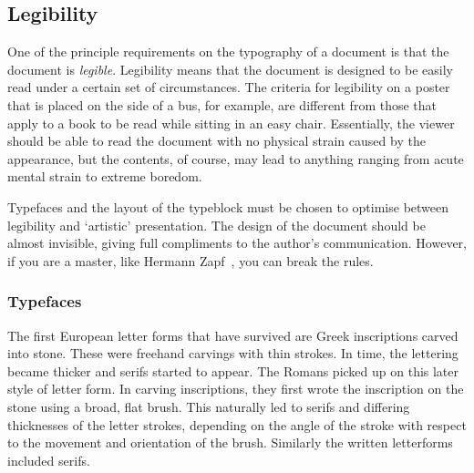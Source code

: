 \documentclass[10pt,letterpaper,extrafontsizes]{memoir}
\begin{document}
    

\subsection{Legibility}

    One of the principle requirements on the typography of a document is 
that the document is \emph{legible}. Legibility 
means that the document 
is designed to be easily read under a certain set of circumstances. 
The criteria for
legibility on a poster that is placed on the side of a bus, for example, are
different from those that apply to a book to be read while sitting in an
easy chair. Essentially, the viewer should be able to read the document
with no physical strain caused by the appearance, but the contents, 
of course, may lead to anything ranging from acute mental strain to 
extreme boredom.

    Typefaces and the layout of the 
typeblock must be 
chosen to optimise between legibility and `artistic' presentation. 
The design of the document should be almost invisible, giving full 
compliments to the author's communication. However, if you are a master, 
like Hermann Zapf~\autocite{ZAPF00}, you can break the rules.

    

\subsubsection{Typefaces}

    The first European letter forms that have survived are Greek inscriptions
carved into stone. These were freehand carvings with thin strokes. In time,
the lettering became thicker and serifs started to appear. The Romans
picked up on this later style of letter form. In carving inscriptions, they
first wrote the inscription on the stone using a broad, flat brush. This
naturally led to serifs and differing thicknesses of the letter strokes,
depending on the angle of the stroke with respect to the movement and
orientation of the brush. Similarly the written letterforms included
serifs.
\end{document}
